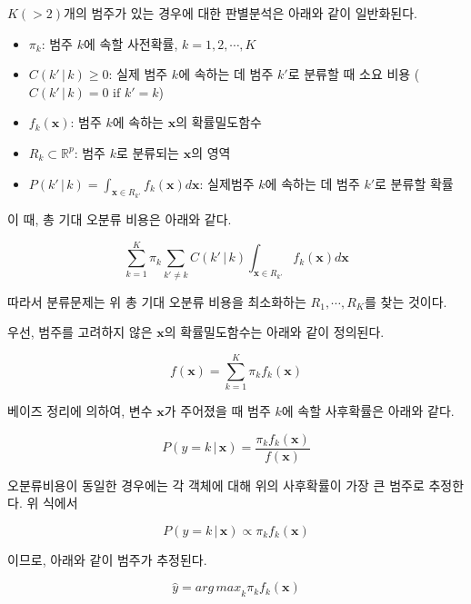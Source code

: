 \documentclass[
]{book}
\providecommand{\tightlist}{%
  \setlength{\itemsep}{0pt}\setlength{\parskip}{0pt}}
\begin{document}
\(K (> 2)\)개의 범주가 있는 경우에 대한 판별분석은 아래와 같이 일반화된다.

\begin{itemize}
\tightlist
\item
  \(\pi_k\): 범주 \(k\)에 속할 사전확률, \(k = 1, 2, \cdots, K\)
\item
  \(C(k' \, | \, k) \ge 0\): 실제 범주 \(k\)에 속하는 데 범주 \(k'\)로 분류할 때 소요 비용 (\(C(k' \, | \, k) = 0 \text{ if } k' = k\))
\item
  \(f_k(\mathbf{x})\): 범주 \(k\)에 속하는 \(\mathbf{x}\)의 확률밀도함수
\item
  \(R_k \subset \mathbb{R}^p\): 범주 \(k\)로 분류되는 \(\mathbf{x}\)의 영역
\item
  \(P(k' \, | \, k) = \int_{\mathbf{x} \in R_{k'}} f_k(\mathbf{x}) d\mathbf{x}\): 실제범주 \(k\)에 속하는 데 범주 \(k'\)로 분류할 확률
\end{itemize}

이 때, 총 기대 오분류 비용은 아래와 같다.

\begin{equation*}
\sum_{k = 1}^{K} \pi_k \sum_{k' \neq k} C(k' \, | \, k) \int_{\mathbf{x} \in R_{k'}} f_k(\mathbf{x}) d\mathbf{x}
\end{equation*}

따라서 분류문제는 위 총 기대 오분류 비용을 최소화하는 \(R_1, \cdots, R_K\)를 찾는 것이다.

우선, 범주를 고려하지 않은 \(\mathbf{x}\)의 확률밀도함수는 아래와 같이 정의된다.

\begin{equation*}
f(\mathbf{x}) = \sum_{k=1}^{K} \pi_k f_k(\mathbf{x})
\end{equation*}

베이즈 정리에 의하여, 변수 \(\mathbf{x}\)가 주어졌을 때 범주 \(k\)에 속할 사후확률은 아래와 같다.

\begin{equation*}
P(y = k \,|\, \mathbf{x}) = \frac{\pi_k f_k(\mathbf{x})}{f(\mathbf{x})}
\end{equation*}

오분류비용이 동일한 경우에는 각 객체에 대해 위의 사후확률이 가장 큰 범주로 추정한다. 위 식에서

\begin{equation*}
P(y = k \,|\, \mathbf{x}) \propto \pi_k f_k(\mathbf{x})
\end{equation*}

이므로, 아래와 같이 범주가 추정된다.

\begin{equation*}
\hat{y} = {arg\,max}_{k} \pi_k f_k(\mathbf{x})
\end{equation*}
\end{document}

